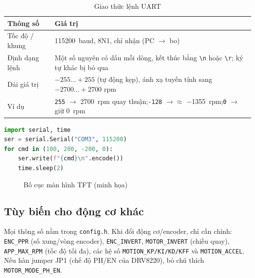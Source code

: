 \begin{table}[H]
\centering\small
\caption{Giao thức lệnh UART}
\label{tab:uartproto}
\begin{tabularx}{\linewidth}{@{}lX@{}}
\toprule
\textbf{Thông số} & \textbf{Giá trị}\\
\midrule
Tốc độ / khung & \SI{115200}{baud}, 8N1, chỉ nhận (PC $\to$ bo)\\
Định dạng lệnh & Một số nguyên có dấu mỗi dòng, kết thúc bằng \texttt{\textbackslash n} hoặc \texttt{\textbackslash r}; ký tự khác bị bỏ qua\\
Dải giá trị & $-255\ldots+255$ (tự động kẹp), ánh xạ tuyến tính sang $-2700\ldots+2700$ rpm\\
Ví dụ & \texttt{255} $\to$ \SI{2700}{rpm} quay thuận;\quad \texttt{-128} $\to\approx$ \SI{-1355}{rpm};\quad \texttt{0} $\to$ giữ \SI{0}{rpm}\\
\bottomrule
\end{tabularx}
\end{table}

\begin{lstlisting}[language=Python,caption={Gửi lệnh tốc độ bằng Python (pyserial)},label={lst:python}]
import serial, time
ser = serial.Serial("COM3", 115200)
for cmd in (100, 200, -200, 0):
    ser.write(f"{cmd}\n".encode())
    time.sleep(2)
\end{lstlisting}

\begin{figure}[H]
\centering
{}
\caption{Bố cục màn hình TFT (minh họa)}
\label{fig:tftlayout}
\end{figure}

\subsection{Tùy biến cho động cơ khác}
Mọi thông số nằm trong \texttt{config.h}. Khi đổi động cơ/encoder, chỉ cần chỉnh: \texttt{ENC\_PPR} (số xung/vòng encoder), \texttt{ENC\_INVERT}, \texttt{MOTOR\_INVERT} (chiều quay), \texttt{APP\_MAX\_RPM} (tốc độ tối đa), các hệ số \texttt{MOTION\_KP/KI/KD/KFF} và \texttt{MOTION\_ACCEL}. Nếu hàn jumper JP1 (chế độ PH/EN của DRV8220), bỏ chú thích \texttt{MOTOR\_MODE\_PH\_EN}.

